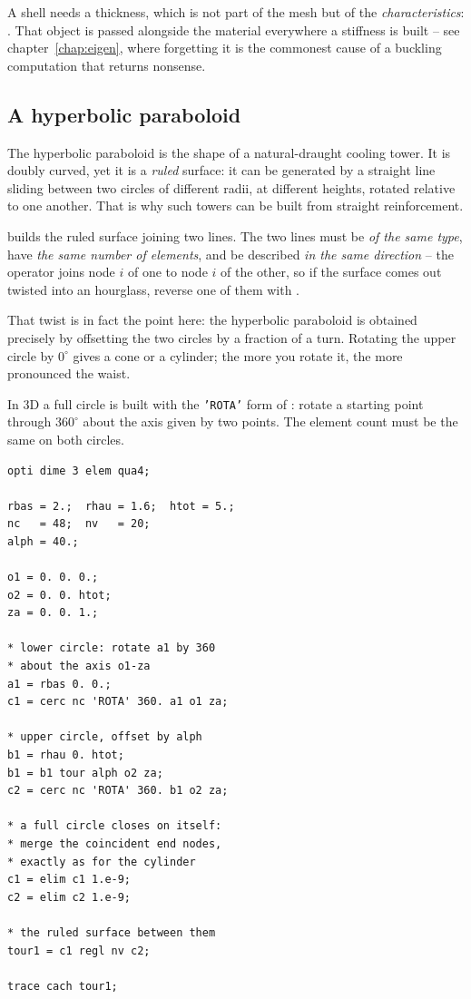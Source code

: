 %
%
\noindent A shell needs a thickness, which is not part of the mesh but of the
\emph{characteristics}: . That object is passed
alongside the material everywhere a stiffness is built -- see
chapter~\ref{chap:eigen}, where forgetting it is the commonest cause of a
buckling computation that returns nonsense.

\subsection*{A hyperbolic paraboloid}

The hyperbolic paraboloid is the shape of a natural-draught cooling tower. It
is doubly curved, yet it is a \emph{ruled} surface: it can be generated by a
straight line sliding between two circles of different radii, at different
heights, rotated relative to one another. That is why such towers can be built
from straight reinforcement.

\begin{castemcom}
  
builds the ruled surface joining two lines. The two lines must be \emph{of the same type}, have
\emph{the same number of elements}, and be described \emph{in the same
direction} -- the operator joins node $i$ of one to node $i$ of the other, so
if the surface comes out twisted into an hourglass, reverse one of them with
.

That twist is in fact the point here: the hyperbolic paraboloid is obtained
precisely by offsetting the two circles by a fraction of a turn. Rotating the
upper circle by $0^{\circ}$ gives a cone or a cylinder; the more you rotate
it, the more pronounced the waist.

\medskip
In 3D a full circle is built with the \texttt{'ROTA'} form of :
rotate a starting point through $360^{\circ}$ about the axis given by two
points. The element count must be the same on both circles.
\end{castemcom}
\begin{castemlines}
\begin{verbatim}
opti dime 3 elem qua4;

rbas = 2.;  rhau = 1.6;  htot = 5.;
nc   = 48;  nv   = 20;
alph = 40.;

o1 = 0. 0. 0.;
o2 = 0. 0. htot;
za = 0. 0. 1.;

* lower circle: rotate a1 by 360
* about the axis o1-za
a1 = rbas 0. 0.;
c1 = cerc nc 'ROTA' 360. a1 o1 za;

* upper circle, offset by alph
b1 = rhau 0. htot;
b1 = b1 tour alph o2 za;
c2 = cerc nc 'ROTA' 360. b1 o2 za;

* a full circle closes on itself:
* merge the coincident end nodes,
* exactly as for the cylinder
c1 = elim c1 1.e-9;
c2 = elim c2 1.e-9;

* the ruled surface between them
tour1 = c1 regl nv c2;

trace cach tour1;
\end{verbatim}
\end{castemlines}

